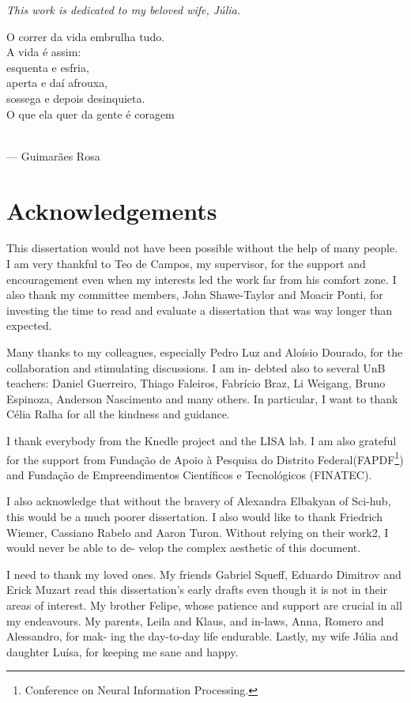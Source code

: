 \documentclass[
  letterpaper,
]{tufte-book}
\renewenvironment{quote}
               {\hspace{4cm}\list{}{\rightmargin\leftmargin}%
                \small%
                \item\relax}
               {\endlist}
\begin{document}
\emph{This work is dedicated to my beloved wife, Júlia.} \vfill

\begin{quote}
O correr da vida embrulha tudo.\\
A vida é assim:\\
esquenta e esfria,\\
aperta e daí afrouxa,\\
sossega e depois desinquieta.\\
O que ela quer da gente é coragem\\
\strut \\
--- Guimarães Rosa
\end{quote}


\hypertarget{acknowledgements}{%
\chapter{Acknowledgements}\label{acknowledgements}}

This dissertation would not have been possible without the help of many
people. I am very thankful to Teo de Campos, my supervisor, for the
support and encouragement even when my interests led the work far from
his comfort zone. I also thank my committee members, John Shawe-Taylor
and Moacir Ponti, for investing the time to read and evaluate a
dissertation that was way longer than expected.

Many thanks to my colleagues, especially Pedro Luz and Aloísio Dourado,
for the collaboration and stimulating discussions. I am in- debted also
to several UnB teachers: Daniel Guerreiro, Thiago Faleiros, Fabrício
Braz, Li Weigang, Bruno Espinoza, Anderson Nascimento and many others.
In particular, I want to thank Célia Ralha for all the kindness and
guidance.

I thank everybody from the Knedle project and the LISA lab. I am also
grateful for the support from Fundação de Apoio à Pesquisa do Distrito
Federal(FAPDF\footnote{Conference on Neural Information Processing.})
and Fundação de Empreendimentos Científicos e Tecnológicos (FINATEC).

I also acknowledge that without the bravery of Alexandra Elbakyan of
Sci-hub, this would be a much poorer dissertation. I also would like to
thank Friedrich Wiemer, Cassiano Rabelo and Aaron Turon. Without relying
on their work2, I would never be able to de- velop the complex aesthetic
of this document.

I need to thank my loved ones. My friends Gabriel Squeff, Eduardo
Dimitrov and Erick Muzart read this dissertation's early drafts even
though it is not in their areas of interest. My brother Felipe, whose
patience and support are crucial in all my endeavours. My parents, Leila
and Klaus, and in-laws, Anna, Romero and Alessandro, for mak- ing the
day-to-day life endurable. Lastly, my wife Júlia and daughter Luísa, for
keeping me sane and happy.
\end{document}
